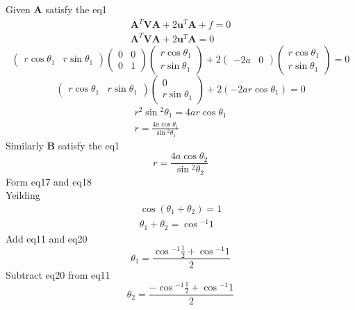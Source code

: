 \documentclass[journal,10pt,twocolumn]{article}
\let\vec\mathbf
\newcommand{\myvec}[1]{\ensuremath{\begin{pmatrix}#1\end{pmatrix}}}
\begin{document}
Given $\vec{A}$ satisfy the eq1
\begin{eqnarray}
	\vec{A}^T\vec{V}\vec{A}+2\vec{u}^T\vec{A}+f=0\\
	\vec{A}^T\vec{V}\vec{A}+2\vec{u}^T\vec{A}=0
\end{eqnarray}
\begin{equation}
	\myvec{r\cos{\theta_1}&r\sin{\theta_1}}\myvec{0&0\\0&1}\myvec{r\cos{\theta_1}\\r\sin{\theta_1}}+2\myvec{-2a&0}\myvec{r\cos{\theta_1}\\r\sin{\theta_1}}=0
\end{equation}
\begin{equation}
	\myvec{r\cos{\theta_1}&r\sin{\theta_1}}\myvec{0\\r\sin{\theta_1}}+2(-2ar\cos{\theta_1})=0
\end{equation}
\begin{eqnarray}
	r^2\sin{^2\theta_1}=4ar\cos{\theta_1}\\
	r=\frac{4a\cos{\theta_1}}{\sin{^2\theta_1}}
\end{eqnarray}
Similarly $\vec{B}$ satisfy the eq1
\begin{equation}
	r=\frac{4a\cos{\theta_2}}{\sin{^2\theta_2}}
\end{equation}
Form eq17 and eq18\\
Yeilding
\begin{eqnarray}
	\cos{(\theta_1+\theta_2)}=1\\
	\theta_1+\theta_2=\cos{^{-1}1}
\end{eqnarray}
Add eq11 and eq20\\
\begin{equation}
	\theta_1=\frac{\cos{^{-1}\frac{1}{2}+\cos{^{-1}1}}}{2}
\end{equation}
Subtract eq20 from eq11
\begin{equation}   
\theta_2=\frac{-\cos{^{-1}\frac{1}{2}+\cos{^{-1}1}}}{2}        
\end{equation}
\end{document}

